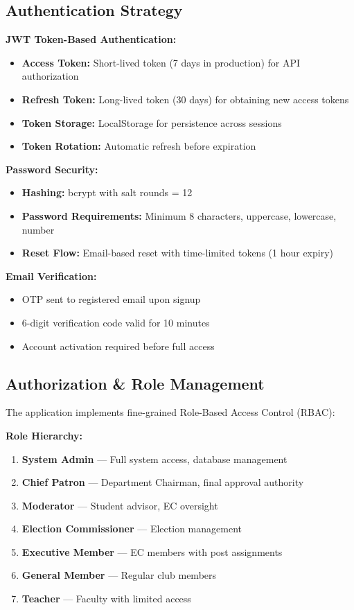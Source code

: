 \documentclass[12pt,a4paper]{article}
\begin{document}
\subsection{Authentication Strategy}

\textbf{JWT Token-Based Authentication:}
\begin{itemize}[noitemsep]
  \item \textbf{Access Token:} Short-lived token (7 days in production) for API authorization
  \item \textbf{Refresh Token:} Long-lived token (30 days) for obtaining new access tokens
  \item \textbf{Token Storage:} LocalStorage for persistence across sessions
  \item \textbf{Token Rotation:} Automatic refresh before expiration
\end{itemize}

\textbf{Password Security:}
\begin{itemize}[noitemsep]
  \item \textbf{Hashing:} bcrypt with salt rounds = 12
  \item \textbf{Password Requirements:} Minimum 8 characters, uppercase, lowercase, number
  \item \textbf{Reset Flow:} Email-based reset with time-limited tokens (1 hour expiry)
\end{itemize}

\textbf{Email Verification:}
\begin{itemize}[noitemsep]
  \item OTP sent to registered email upon signup
  \item 6-digit verification code valid for 10 minutes
  \item Account activation required before full access
\end{itemize}

\subsection{Authorization \& Role Management}

The application implements fine-grained Role-Based Access Control (RBAC):

\textbf{Role Hierarchy:}
\begin{enumerate}[noitemsep]
  \item \textbf{System Admin} — Full system access, database management
  \item \textbf{Chief Patron} — Department Chairman, final approval authority
  \item \textbf{Moderator} — Student advisor, EC oversight
  \item \textbf{Election Commissioner} — Election management
  \item \textbf{Executive Member} — EC members with post assignments
  \item \textbf{General Member} — Regular club members
  \item \textbf{Teacher} — Faculty with limited access
\end{enumerate}
\end{document}
